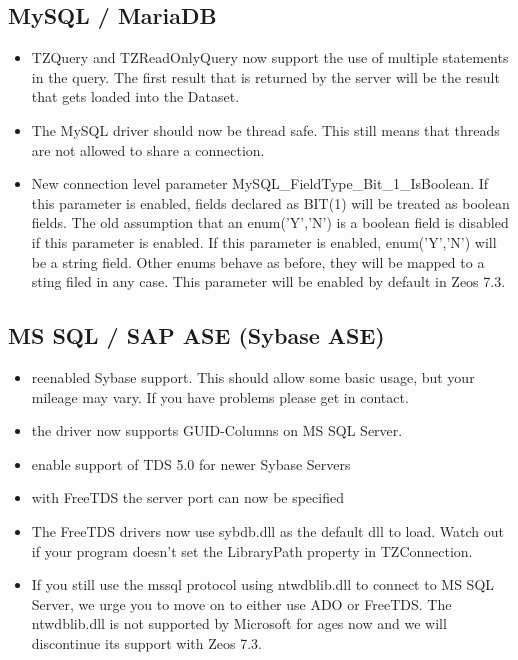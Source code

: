 \documentclass[a4paper,12pt,oneside]{article}
\begin{document}
\subsection{MySQL / MariaDB}
\label{sec:DriverSpecificChanges_MysqlMariadb}
\begin{itemize}
\item
  TZQuery and TZReadOnlyQuery now support the use of multiple statements in the query.
	The first result that is returned by the server will be the result that gets loaded into the Dataset.
\item
  The MySQL driver should now be thread safe.
	This still means that threads are not allowed to share a connection.
\item
  New connection level parameter MySQL\_FieldType\_Bit\_1\_IsBoolean.
	If this parameter is enabled, fields declared as BIT(1) will be treated as boolean fields.
	The old assumption that an enum('Y','N') is a boolean field is disabled if this parameter is enabled.
	If this parameter is enabled, enum('Y','N') will be a string field.
	Other enums behave as before, they will be mapped to a sting filed in any case.
	This parameter will be enabled by default in Zeos 7.3.
\end{itemize}

\subsection{MS SQL / SAP ASE (Sybase ASE)}
\label{sec:DriverSpecificChanges_MssqlAse}
\begin{itemize}
\item 
  reenabled Sybase support.
	This should allow some basic usage, but your mileage may vary.
	If you have problems please get in contact.
\item the driver now supports GUID-Columns on MS SQL Server.
\item enable support of TDS 5.0 for newer Sybase Servers
\item with FreeTDS the server port can now be specified
\item 
  The FreeTDS drivers now use sybdb.dll as the default dll to load.
	Watch out if your program doesn't set the LibraryPath property in TZConnection.
\item 
  If you still use the mssql protocol using ntwdblib.dll to connect to MS SQL Server, we urge you to move on to either use ADO or FreeTDS.
	The ntwdblib.dll is not supported by Microsoft for ages now and we will discontinue its support with Zeos 7.3.
\end{itemize}
\end{document}
